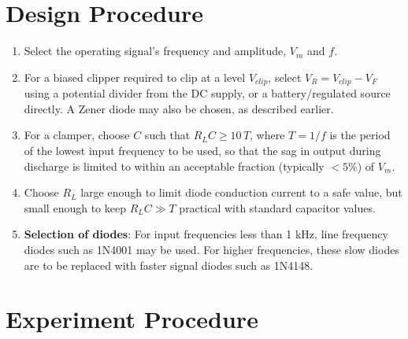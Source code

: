 \section{Design Procedure}

\begin{enumerate}[label=(\alph*)]
	\item Select the operating signal's frequency and amplitude, $V_m$ and $f$. 
	\item For a biased clipper required to clip at a level $V_{clip}$, select $V_R = V_{clip} - V_F$ using a potential divider from the DC supply, or a battery/regulated source directly. A Zener diode may also be chosen, as described earlier.
	\item For a clamper, choose $C$ such that $R_L C \geq 10\,T$, where $T = 1/f$ is the period of the lowest input frequency to be used, so that the sag in output during discharge is limited to within an acceptable fraction (typically $< 5\%$) of $V_m$.
	\item Choose $R_L$ large enough to limit diode conduction current to a safe value, but small enough to keep $R_L C \gg T$ practical with standard capacitor values.
	\item \textbf{Selection of diodes}: For input frequencies less than 1 kHz, line frequency diodes such as 1N4001 may be used. For higher frequencies, these slow diodes are to be replaced with faster signal diodes such as 1N4148.
\end{enumerate}

\section{Experiment Procedure}

